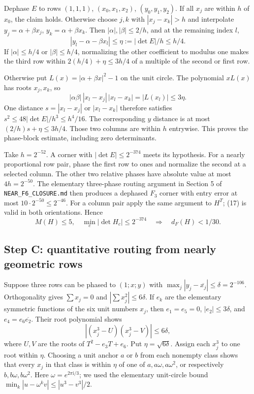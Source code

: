 \documentclass[11pt]{article}
\newcommand{\ii}{\mathrm i}
\begin{document}
Dephase $E$ to rows $(1,1,1)$, $(x_0,x_1,x_2)$,
$(y_0,y_1,y_2)$. If all $x_j$ are within $h$ of $x_0$, the claim holds.
Otherwise choose $j,k$ with $|x_j-x_k|>h$ and interpolate
$y_j=\alpha+\beta x_j$, $y_k=\alpha+\beta x_k$.
Then $|\alpha|,|\beta|\le2/h$, and at the remaining index $l$,
\[
 |y_l-\alpha-\beta x_l|\le\eta:=|\det E|/h\le h/4.
\]
If $|\alpha|\le h/4$ or $|\beta|\le h/4$, normalizing the other
coefficient to modulus one makes the third row within
$2(h/4)+\eta\le3h/4$ of a multiple of the second or first row.

Otherwise put $L(x)=|\alpha+\beta x|^2-1$ on the unit circle.
The polynomial $xL(x)$ has roots $x_j,x_k$, so
\[
 |\alpha\beta|\,|x_l-x_j|\,|x_l-x_k|
 =|L(x_l)|\le3\eta.
\]
One distance $s=|x_l-x_j|$ or $|x_l-x_k|$ therefore satisfies
$s^2\le48|\det E|/h^3\le h^4/16$.
The corresponding $y$ distance is at most
$(2/h)s+\eta\le3h/4$. Those two columns are within $h$ entrywise.
This proves the phase-block estimate, including zero determinants.

Take $h=2^{-52}$. A corner with $|\det E|\le2^{-374}$ meets its
hypothesis. For a nearly proportional row pair, phase the first row
to ones and normalize the second at a selected column. The other two
relative phases have absolute value at most $4h=2^{-50}$.
The elementary three-phase routing argument in Section 5 of
\texttt{NEAR\_F6\_CLOSURE.md} then produces a dephased $F_3$ corner
with entry error at most $10\cdot2^{-50}\le2^{-46}$.
For a column pair apply the same argument to $H^T$; (17) is valid in
both orientations. Hence
\[
 M(H)\le5,\quad\min_c|\det H_c|\le2^{-374}
 \quad\Longrightarrow\quad d_F(H)<1/30.\tag{18}
\]

\subsection*{Step C: quantitative routing from nearly geometric rows}
Suppose three rows can be phased to $(1;x;y)$ with
$\max_j|y_j-\overline{x_j}|\le\delta=2^{-106}$.
Orthogonality gives $\sum x_j=0$ and $|\sum x_j^2|\le6\delta$.
If $e_k$ are the elementary symmetric functions of the six unit numbers
$x_j$, then $e_1=e_5=0$, $|e_2|\le3\delta$, and
$e_4=e_6\overline{e_2}$. Their root polynomial shows
\[
 |(x_j^3-U)(x_j^3-V)|\le6\delta,\tag{19}
\]
where $U,V$ are the roots of $T^2-e_3T+e_6$.
Put $\eta=\sqrt{6\delta}$. Assign each $x_j^3$ to one root within
$\eta$. Choosing a unit anchor $a$ or $b$ from each nonempty class
shows that every $x_j$ in that class is within $\eta$ of one of
$a,a\omega,a\omega^2$, or respectively $b,b\omega,b\omega^2$.
Here $\omega=e^{2\pi\ii/3}$; we used the elementary unit-circle bound
$\min_k|u-\omega^kv|\le|u^3-v^3|/2$.
\end{document}

